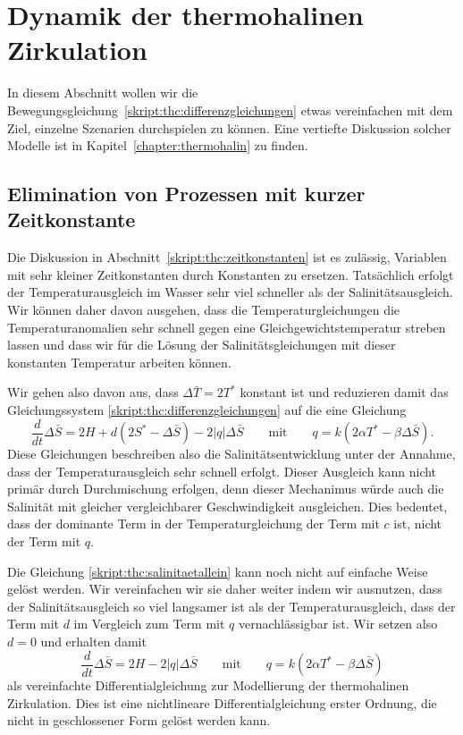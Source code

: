 %
%
%
\section{Dynamik der thermohalinen Zirkulation}
In diesem Abschnitt wollen wir die
Bewegungsgleichung~\ref{skript:thc:differenzgleichungen}
etwas vereinfachen mit dem Ziel, einzelne Szenarien durchspielen
zu können.
Eine vertiefte Diskussion solcher Modelle ist in
Kapitel~\ref{chapter:thermohalin} zu finden.

\subsection{Elimination von Prozessen mit kurzer Zeitkonstante}
Die Diskussion in Abschnitt~\ref{skript:thc:zeitkonstanten}
ist es zulässig, Variablen mit sehr kleiner Zeitkonstanten
durch Konstanten zu ersetzen.
Tatsächlich erfolgt der Temperaturausgleich im Wasser sehr viel
schneller als der Salinitätsausgleich.
Wir können daher davon ausgehen, dass die Temperaturgleichungen
die Temperaturanomalien sehr schnell gegen eine Gleichgewichtstemperatur
streben lassen und dass wir für die Lösung der Salinitätsgleichungen
mit dieser konstanten Temperatur arbeiten können.

Wir gehen also davon aus, dass $\Delta\bar T=2T^*$ konstant ist und
reduzieren damit das Gleichungssystem
\eqref{skript:thc:differenzgleichungen}
auf die eine Gleichung
\begin{equation}
\frac{d}{dt}\Delta\bar S
=
2H + d(2S^* -\Delta\bar S) - 2|q|\Delta\bar S
\qquad\text{mit}\qquad
q=k(2\alpha T^* -\beta \Delta\bar S).
\label{skript:thc:salinitaetallein}
\end{equation}
Diese Gleichungen beschreiben also die Salinitätsentwicklung unter
der Annahme, dass der Temperaturausgleich sehr schnell erfolgt.
Dieser Ausgleich kann nicht primär durch Durchmischung erfolgen,
denn dieser Mechanimus würde auch die Salinität mit gleicher
vergleichbarer Geschwindigkeit ausgleichen.
Dies bedeutet, dass der dominante Term in der Temperaturgleichung
der Term mit $c$ ist, nicht der Term mit $q$.

Die Gleichung \eqref{skript:thc:salinitaetallein} kann noch nicht auf
einfache Weise gelöst werden.
Wir vereinfachen wir sie daher weiter indem wir ausnutzen, dass 
der Salinitätsausgleich so viel langsamer ist als der Temperaturausgleich,
dass der Term mit $d$ im Vergleich zum Term mit $q$ vernachlässigbar ist.
Wir setzen also $d=0$ und
erhalten damit 
\begin{equation}
\frac{d}{dt}\Delta\bar S
=
2H - 2|q|\Delta\bar S
\qquad\text{mit}\qquad
q=k(2\alpha T^* -\beta \Delta\bar S)
\label{skript:thc:qgleichung}
\end{equation}
als vereinfachte Differentialgleichung zur Modellierung der 
thermohalinen Zirkulation.
Dies ist eine nichtlineare Differentialgleichung erster Ordnung,
die nicht in geschlossener Form gelöst werden kann.

